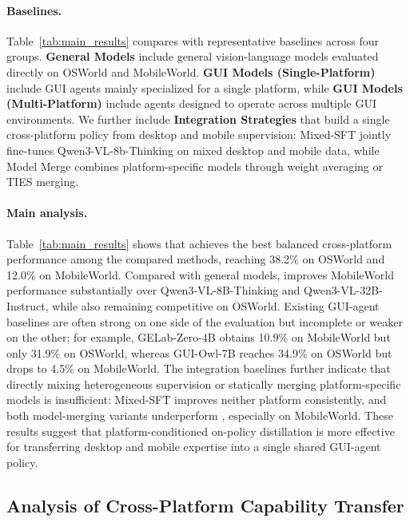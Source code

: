 \paragraph{Baselines.}

Table~\ref{tab:main_results} compares \METHODNAME with representative
baselines across four groups. \textbf{General Models} include general
vision-language models evaluated directly on OSWorld and
MobileWorld. \textbf{GUI Models (Single-Platform)} include GUI agents mainly
specialized for a single platform, while \textbf{GUI Models
(Multi-Platform)} include agents designed to operate across multiple GUI
environments. We further include \textbf{Integration Strategies} that build a
single cross-platform policy from desktop and mobile supervision: Mixed-SFT
jointly fine-tunes Qwen3-VL-8b-Thinking on mixed desktop and mobile data, while Model
Merge combines platform-specific models through weight averaging or TIES
merging.

\paragraph{Main analysis.}
Table~\ref{tab:main_results} shows that \METHODNAME achieves the best
balanced cross-platform performance among the compared methods, reaching
38.2\% on OSWorld and 12.0\% on MobileWorld. Compared with general models,
\METHODNAME improves MobileWorld performance substantially over
Qwen3-VL-8B-Thinking and Qwen3-VL-32B-Instruct, while also remaining
competitive on OSWorld. Existing GUI-agent baselines are often strong on one
side of the evaluation but incomplete or weaker on the other; for example,
GELab-Zero-4B obtains 10.9\% on MobileWorld but only 31.9\% on OSWorld,
whereas GUI-Owl-7B reaches 34.9\% on OSWorld but drops to 4.5\% on
MobileWorld. The integration baselines further indicate that directly mixing
heterogeneous supervision or statically merging platform-specific models is
insufficient: Mixed-SFT improves neither platform consistently, and both
model-merging variants underperform \METHODNAME, especially on MobileWorld.
These results suggest that platform-conditioned on-policy distillation is
more effective for transferring desktop and mobile expertise into a single
shared GUI-agent policy.


\subsection{Analysis of Cross-Platform Capability Transfer}
\label{sec:exp_retention}

